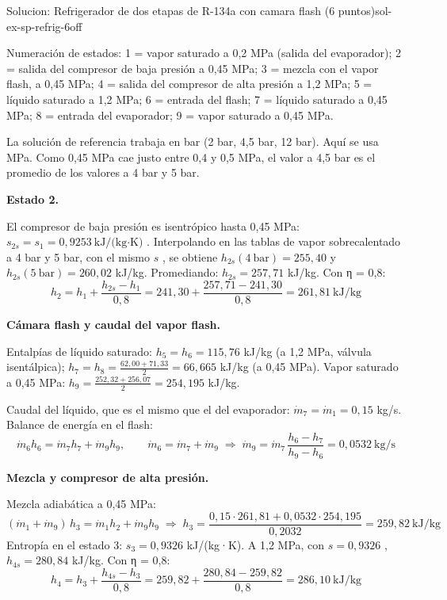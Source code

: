 \documentclass[11pt,a4paper]{article}
\begin{document}
\begin{ocg}{Solucion: Refrigerador de dos etapas de R-134a con camara flash (6 puntos)}{sol-ex-sp-refrig-6}{off}
\begin{antesbox}
Numeración de estados: 1 = vapor saturado a 0,2 MPa (salida del evaporador); 2 = salida del compresor de baja presión a 0,45 MPa; 3 = mezcla con el vapor flash, a 0,45 MPa; 4 = salida del compresor de alta presión a 1,2 MPa; 5 = líquido saturado a 1,2 MPa; 6 = entrada del flash; 7 = líquido saturado a 0,45 MPa; 8 = entrada del evaporador; 9 = vapor saturado a 0,45 MPa.

La solución de referencia trabaja en bar (2 bar, 4,5 bar, 12 bar). Aquí se usa MPa. Como 0,45 MPa cae justo entre 0,4 y 0,5 MPa, el valor a 4,5 bar es el promedio de los valores a 4 bar y 5 bar.
\end{antesbox}

\par\medskip\noindent\textbf{Estado 2.}\par
El compresor de baja presión es isentrópico hasta 0,45 MPa:  $s_{2s} = s_1 = 0{,}9253\ \text{kJ/(kg·K)}$ . Interpolando en las tablas de vapor sobrecalentado a 4 bar y 5 bar, con el mismo  $s$ , se obtiene  $h_{2s}(4\ \text{bar}) = 255{,}40$  y  $h_{2s}(5\ \text{bar}) = 260{,}02$  kJ/kg. Promediando:  $h_{2s} = 257{,}71$  kJ/kg. Con η = 0,8:  \[h_2 = h_1 + \frac{h_{2s} - h_1}{0{,}8} = 241{,}30 + \frac{257{,}71 - 241{,}30}{0{,}8} = 261{,}81\ \text{kJ/kg}\]

\par\medskip\noindent\textbf{Cámara flash y caudal del vapor flash.}\par
Entalpías de líquido saturado:  $h_5 = h_6 = 115{,}76$  kJ/kg (a 1,2 MPa, válvula isentálpica);  $h_7 = h_8 = \frac{62{,}00 + 71{,}33}{2} = 66{,}665$  kJ/kg (a 0,45 MPa). Vapor saturado a 0,45 MPa:  $h_9 = \frac{252{,}32 + 256{,}07}{2} = 254{,}195$  kJ/kg.

Caudal del líquido, que es el mismo que el del evaporador:  $\dot m_7 = \dot m_1 = 0{,}15$  kg/s. Balance de energía en el flash:  \[\dot m_6 h_6 = \dot m_7 h_7 + \dot m_9 h_9,\qquad \dot m_6 = \dot m_7 + \dot m_9 \;\Rightarrow\; \dot m_9 = \dot m_7\,\frac{h_6 - h_7}{h_9 - h_6} = 0{,}0532\ \text{kg/s}\]

\par\medskip\noindent\textbf{Mezcla y compresor de alta presión.}\par
Mezcla adiabática a 0,45 MPa:  \[(\dot m_1 + \dot m_9)\,h_3 = \dot m_1 h_2 + \dot m_9 h_9 \;\Rightarrow\; h_3 = \frac{0{,}15\cdot 261{,}81 + 0{,}0532\cdot 254{,}195}{0{,}2032} = 259{,}82\ \text{kJ/kg}\]  Entropía en el estado 3:  $s_3 = 0{,}9326$  kJ/(kg·K). A 1,2 MPa, con  $s = 0{,}9326$ ,  $h_{4s} = 280{,}84$  kJ/kg. Con η = 0,8:  \[h_4 = h_3 + \frac{h_{4s} - h_3}{0{,}8} = 259{,}82 + \frac{280{,}84 - 259{,}82}{0{,}8} = 286{,}10\ \text{kJ/kg}\]


\end{ocg}
\end{document}
